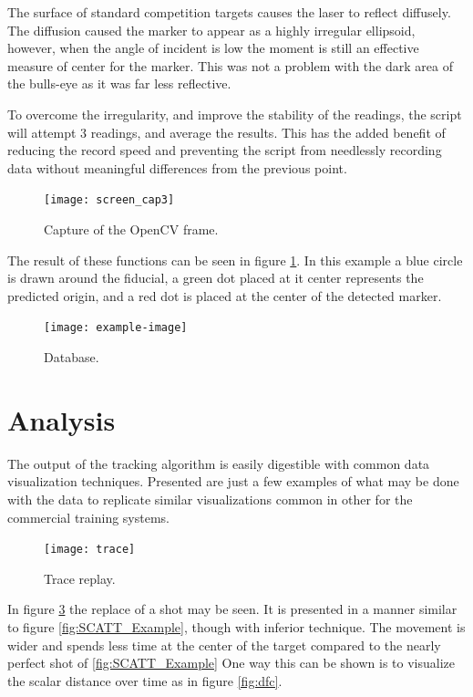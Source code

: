 \documentclass[conference]{IEEEtran}
\begin{document}
The surface of standard competition targets causes the laser to reflect diffusely.
The diffusion caused the marker to appear as a highly irregular ellipsoid,
however, when the angle of incident is low the moment is still an effective measure of center for the marker.
This was not a problem with the dark area of the bulls-eye as it was far less reflective.

To overcome the irregularity, and improve the stability of the readings, the script will attempt 3 readings, and average the results.
This has the added benefit of reducing the record speed and preventing the script from needlessly recording data without meaningful differences from the previous point.



\begin{figure}[]
	\centering
	\texttt{[image: screen\_cap3]}
	\caption{Capture of the OpenCV frame.}
	\label{fig:screen_cap}
\end{figure}

The result of these functions can be seen in figure \ref{fig:screen_cap}.
In this example a blue circle is drawn around the fiducial,
a green dot placed at it center represents the predicted origin, and
a red dot is placed at the center of the detected marker.

\begin{figure}[]
	\centering
	\texttt{[image: example-image]}
	\caption{Database.}
	\label{fig:database}
\end{figure}


\section{Analysis}

The output of the tracking algorithm is easily digestible with common data visualization techniques.
Presented are just a few examples of what may be done with the data to replicate similar visualizations common in other for the commercial training systems.

\begin{figure}[]
	\centering
	\texttt{[image: trace]}
	\caption{Trace replay.}
	\label{fig:trace}
\end{figure}

In figure \ref{fig:trace} the replace of a shot may be seen.
It is presented in a manner similar to figure \ref{fig:SCATT_Example}, 
though with inferior technique.
The movement is wider and spends less time at the center of the target compared to the nearly perfect shot of  \ref{fig:SCATT_Example}
One way this can be shown is to visualize the scalar distance over time as in figure \ref{fig:dfc}.
\end{document}
